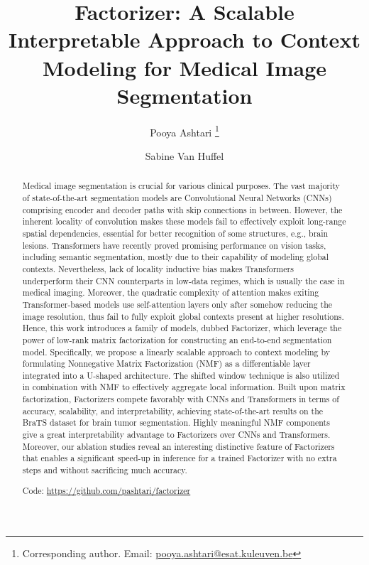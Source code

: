 \documentclass[a4,12pt]{article}
\title{\bfseries Factorizer: A Scalable Interpretable Approach to Context Modeling for Medical Image Segmentation}
\author[a]{\normalsize Pooya Ashtari \footnote{Corresponding author. Email: \url{pooya.ashtari@esat.kuleuven.be}}}
\author[a]{\normalsize Sabine Van Huffel}
\affil[a]{\footnotesize Department of Electrical Engineering (ESAT), KU Leuven}
\date{}
\begin{document}
	\maketitle
	
	\begin{abstract}
		Medical image segmentation is crucial for various clinical purposes. The vast majority of state-of-the-art segmentation models are Convolutional Neural Networks (CNNs) comprising encoder and decoder paths with skip connections in between. However, the inherent locality of convolution makes these models fail to effectively exploit long-range spatial dependencies, essential for better recognition of some structures, e.g., brain lesions. Transformers have recently proved promising performance on vision tasks, including semantic segmentation, mostly due to their capability of modeling global contexts. Nevertheless, lack of locality inductive bias makes Transformers underperform their CNN counterparts in low-data regimes, which is usually the case in medical imaging. Moreover, the quadratic complexity of attention makes exiting Transformer-based models use self-attention layers only after somehow reducing the image resolution, thus fail to fully exploit global contexts present at higher resolutions. Hence, this work introduces a family of models, dubbed Factorizer, which leverage the power of low-rank matrix factorization for constructing an end-to-end segmentation model. Specifically, we propose a linearly scalable approach to context modeling by formulating Nonnegative Matrix Factorization (NMF) as a differentiable layer integrated into a U-shaped architecture. The shifted window technique is also utilized in combination with NMF to effectively aggregate local information. Built upon matrix factorization, Factorizers compete favorably with CNNs and Transformers in terms of accuracy, scalability, and interpretability, achieving state-of-the-art results on the BraTS dataset for brain tumor segmentation. Highly meaningful NMF components give a great interpretability advantage to Factorizers over CNNs and Transformers. Moreover, our ablation studies reveal an interesting distinctive feature of Factorizers that enables a significant speed-up in inference for a trained Factorizer with no extra steps and without sacrificing much accuracy.	
		
		\vspace{4pt}\noindent Code: \url{https://github.com/pashtari/factorizer}
		\vspace{4pt}
	\end{abstract}
	
\end{document}

